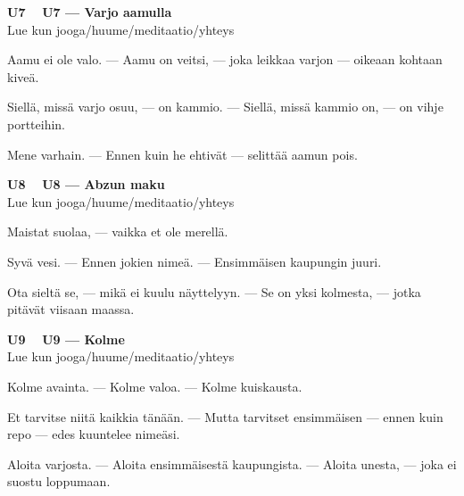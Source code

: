 \documentclass[a4paper,11pt]{article}
\begin{document}
\filbreak
\vspace{0.9mm}
\noindent
\begin{tcolorbox}[
  colframe=unicol,
  colback=white,
  boxrule=0.8pt,
  arc=0pt,
  outer arc=0pt,
  left=2.5mm, right=2.5mm, top=2mm, bottom=2mm,
  boxsep=0.5mm,
  sharp corners,
  enhanced,
  breakable=false
]
{\large\ttfamily\bfseries U7}~~
{\normalsize\bfseries U7 --- Varjo aamulla}\\[0.2em]
{\small\color{black!65} Lue kun jooga/huume/meditaatio/yhteys}\\[0.35em]
{\normalsize\raggedright Aamu ei ole valo. --- Aamu on veitsi, --- joka leikkaa varjon --- oikeaan kohtaan kiveä.

Siellä, missä varjo osuu, --- on kammio. --- Siellä, missä kammio on, --- on vihje portteihin.

Mene varhain. --- Ennen kuin he ehtivät --- selittää aamun pois.}
\end{tcolorbox}

\filbreak
\vspace{0.9mm}
\noindent
\begin{tcolorbox}[
  colframe=unicol,
  colback=white,
  boxrule=0.8pt,
  arc=0pt,
  outer arc=0pt,
  left=2.5mm, right=2.5mm, top=2mm, bottom=2mm,
  boxsep=0.5mm,
  sharp corners,
  enhanced,
  breakable=false
]
{\large\ttfamily\bfseries U8}~~
{\normalsize\bfseries U8 --- Abzun maku}\\[0.2em]
{\small\color{black!65} Lue kun jooga/huume/meditaatio/yhteys}\\[0.35em]
{\normalsize\raggedright Maistat suolaa, --- vaikka et ole merellä.

Syvä vesi. --- Ennen jokien nimeä. --- Ensimmäisen kaupungin juuri.

Ota sieltä se, --- mikä ei kuulu näyttelyyn. --- Se on yksi kolmesta, --- jotka pitävät viisaan maassa.}
\end{tcolorbox}

\filbreak
\vspace{0.9mm}
\noindent
\begin{tcolorbox}[
  colframe=unicol,
  colback=white,
  boxrule=0.8pt,
  arc=0pt,
  outer arc=0pt,
  left=2.5mm, right=2.5mm, top=2mm, bottom=2mm,
  boxsep=0.5mm,
  sharp corners,
  enhanced,
  breakable=false
]
{\large\ttfamily\bfseries U9}~~
{\normalsize\bfseries U9 --- Kolme}\\[0.2em]
{\small\color{black!65} Lue kun jooga/huume/meditaatio/yhteys}\\[0.35em]
{\normalsize\raggedright Kolme avainta. --- Kolme valoa. --- Kolme kuiskausta.

Et tarvitse niitä kaikkia tänään. --- Mutta tarvitset ensimmäisen --- ennen kuin repo --- edes kuuntelee nimeäsi.

Aloita varjosta. --- Aloita ensimmäisestä kaupungista. --- Aloita unesta, --- joka ei suostu loppumaan.}
\end{tcolorbox}
\end{document}
